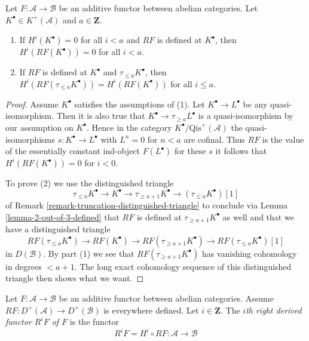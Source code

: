 \begin{lemma}
\label{lemma-negative-vanishing}
Let $F : \mathcal{A} \to \mathcal{B}$ be an additive functor
between abelian categories. Let $K^\bullet \in K^{+}(\mathcal{A})$
and $a \in \mathbf{Z}$.
\begin{enumerate}
\item If $H^i(K^\bullet) = 0$ for all $i < a$ and $RF$ is defined at
$K^\bullet$, then $H^i(RF(K^\bullet)) = 0$ for all $i < a$.
\item If $RF$ is defined at $K^\bullet$ and $\tau_{\leq a}K^\bullet$,
then $H^i(RF(\tau_{\leq a}K^\bullet)) = H^i(RF(K^\bullet))$
for all $i \leq a$.
\end{enumerate}
\end{lemma}

\begin{proof}
Assume $K^\bullet$ satisfies the assumptions of (1).
Let $K^\bullet \to L^\bullet$ be any quasi-isomorphism.
Then it is also true that $K^\bullet \to \tau_{\geq a}L^\bullet$
is a quasi-isomorphism by our assumption on $K^\bullet$.
Hence in the category $K^\bullet/\text{Qis}^{+}(\mathcal{A})$ the
quasi-isomorphisms $s : K^\bullet \to L^\bullet$ with $L^n = 0$ for $n < a$
are cofinal. Thus $RF$ is the value of the essentially constant
ind-object $F(L^\bullet)$ for these $s$ it follows that
$H^i(RF(K^\bullet)) = 0$ for $i < 0$.

\medskip\noindent
To prove (2) we use the distinguished triangle
$$
\tau_{\leq a}K^\bullet \to K^\bullet \to \tau_{\geq a + 1}K^\bullet
\to (\tau_{\leq a}K^\bullet)[1]
$$
of Remark \ref{remark-truncation-distinguished-triangle} to conclude
via Lemma \ref{lemma-2-out-of-3-defined} that
$RF$ is defined at $\tau_{\geq a + 1}K^\bullet$ as well and that we have
a distinguished triangle
$$
RF(\tau_{\leq a}K^\bullet) \to RF(K^\bullet) \to RF(\tau_{\geq a + 1}K^\bullet)
\to RF(\tau_{\leq a}K^\bullet)[1]
$$
in $D(\mathcal{B})$. By part (1) we see that $RF(\tau_{\geq a + 1}K^\bullet)$
has vanishing cohomology in degrees $< a + 1$. The long exact cohomology
sequence of this distinguished triangle then shows what we want.
\end{proof}

\begin{definition}
\label{definition-higher-derived-functors}
Let $F : \mathcal{A} \to \mathcal{B}$ be an additive functor
between abelian categories. Assume
$RF : D^{+}(\mathcal{A}) \to D^{+}(\mathcal{B})$ is everywhere
defined. Let $i \in \mathbf{Z}$.
The {\it $i$th right derived functor $R^iF$ of $F$} is the functor
$$
R^iF = H^i \circ RF :
\mathcal{A}
\longrightarrow
\mathcal{B}
$$
\end{definition}


